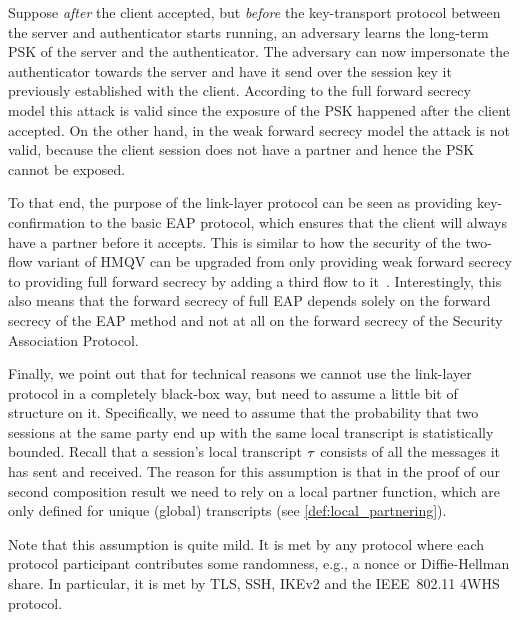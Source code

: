 Suppose \emph{after} the client accepted,
but \emph{before} the key-transport protocol between the server and authenticator starts running,
an adversary learns the long-term PSK of the server and the authenticator.
The adversary can now impersonate the authenticator towards the server and have it send over the session key it previously established with the client. 
According to the full forward secrecy model \akefstext this attack is valid since the exposure of the PSK happened after the client accepted.
On the other hand,
in the weak forward secrecy model \akewfstext the attack is not valid,
because the client session does not have a partner and hence the PSK cannot be exposed.

To that end,
the purpose of the link-layer protocol can be seen as providing key-confirmation to the basic EAP protocol,
which ensures that the client will always have a partner before it accepts.
This is similar to how the security of the two-flow variant of HMQV can be upgraded from only providing weak forward secrecy to providing full forward secrecy by adding a third flow to it~\cite[§3]{C:Krawczyk05}.
Interestingly,
this also means that the forward secrecy of full EAP depends solely on the forward secrecy of the EAP method
and not at all on the forward secrecy of the Security Association Protocol.

Finally,
we point out that for technical reasons we cannot use the link-layer protocol in a completely black-box way,
but need to assume a little bit of structure on it.
Specifically,
we need to assume that the probability that two sessions at the same party end up with the same local transcript is statistically bounded.
Recall that a session's local transcript $\tau$ consists of all the messages it has sent and received.
The reason for this assumption is that in the proof of our second composition result we need to rely on a local partner function,
which are only defined for unique (global) transcripts
(see \cref{def:local_partnering}).

Note that this assumption is quite mild.
It is met by any protocol where each protocol participant contributes some randomness,
e.g., a nonce or Diffie-Hellman share.
In particular,
it is met by TLS, SSH, IKEv2 and the IEEE~802.11 4WHS protocol.

